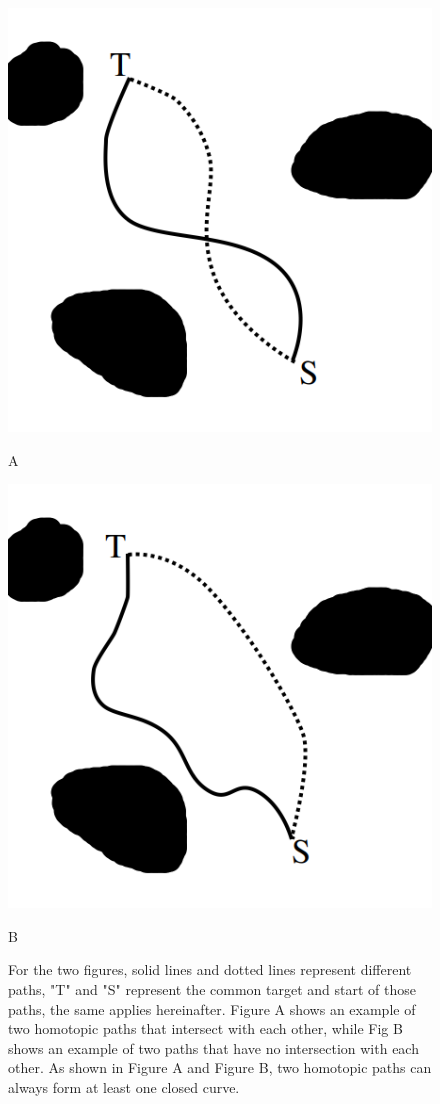 \documentclass[letterpaper, 10 pt, journal, twoside]{IEEEtran}
\begin{document}
\begin{figure}[t] \scriptsize
\begin{minipage}{.48\linewidth}
  \centerline{\includegraphics[width=4.cm, cframe=gray .2mm]{path_intersect.png}}
  \centerline{A}
\end{minipage}
\hfill
\begin{minipage}{.48\linewidth}
  \centerline{\includegraphics[width=4.cm, cframe=gray .2mm]{path_no_intersect.png}}
  \centerline{B}
\end{minipage}
\vfill

\caption{
For the two figures, solid lines and dotted lines represent different paths, "T" and "S" represent the common target and start of those paths, the same applies hereinafter. Figure A shows an example of two homotopic paths that intersect with each other, while Fig B shows an example of two paths that have no intersection with each other. As shown in Figure A and Figure B, two homotopic paths can always form at least one closed curve.
}
\label{path_intersect}
\end{figure}
\end{document}
